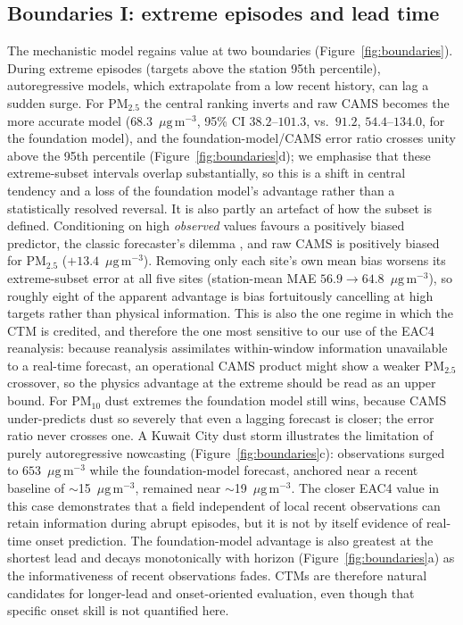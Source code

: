 \documentclass[review,times,authoryear]{elsarticle}
\newcommand*{\ugm}{\ensuremath{\mu\mathrm{g\,m^{-3}}}}
\newcommand*{\pmtf}{\ensuremath{\mathrm{PM_{2.5}}}}
\newcommand*{\pmten}{\ensuremath{\mathrm{PM_{10}}}}
\begin{document}
\subsection{Boundaries I: extreme episodes and lead time}
The mechanistic model regains value at two boundaries (Figure~\ref{fig:boundaries}). During extreme episodes (targets above the station 95th percentile), autoregressive models, which extrapolate from a low recent history, can lag a sudden surge. For \pmtf{} the central ranking inverts and raw CAMS becomes the more accurate model ($68.3$~\ugm, 95\% CI $38.2$--$101.3$, vs.\ $91.2$, $54.4$--$134.0$, for the foundation model), and the foundation-model/CAMS error ratio crosses unity above the 95th percentile (Figure~\ref{fig:boundaries}d); we emphasise that these extreme-subset intervals overlap substantially, so this is a shift in central tendency and a loss of the foundation model's advantage rather than a statistically resolved reversal. It is also partly an artefact of how the subset is defined. Conditioning on high \emph{observed} values favours a positively biased predictor, the classic forecaster's dilemma \citep{lerch2017}, and raw CAMS is positively biased for \pmtf{} ($+13.4$~\ugm). Removing only each site's own mean bias worsens its extreme-subset error at all five sites (station-mean MAE $56.9\rightarrow64.8$~\ugm), so roughly eight of the apparent advantage is bias fortuitously cancelling at high targets rather than physical information. This is also the one regime in which the CTM is credited, and therefore the one most sensitive to our use of the EAC4 reanalysis: because reanalysis assimilates within-window information unavailable to a real-time forecast, an operational CAMS product might show a weaker \pmtf{} crossover, so the physics advantage at the extreme should be read as an upper bound. For \pmten{} dust extremes the foundation model still wins, because CAMS under-predicts dust so severely that even a lagging forecast is closer; the error ratio never crosses one. A Kuwait City dust storm illustrates the limitation of purely autoregressive nowcasting (Figure~\ref{fig:boundaries}c): observations surged to $653$~\ugm{} while the foundation-model forecast, anchored near a recent baseline of $\sim$15~\ugm{}, remained near $\sim$19~\ugm{}. The closer EAC4 value in this case demonstrates that a field independent of local recent observations can retain information during abrupt episodes, but it is not by itself evidence of real-time onset prediction. The foundation-model advantage is also greatest at the shortest lead and decays monotonically with horizon (Figure~\ref{fig:boundaries}a) as the informativeness of recent observations fades. CTMs are therefore natural candidates for longer-lead and onset-oriented evaluation, even though that specific onset skill is not quantified here.
\end{document}
